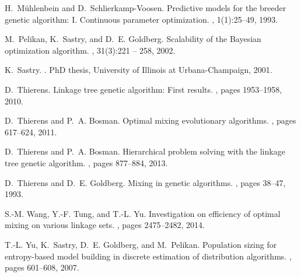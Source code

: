 \documentclass{sig-alternate}
\begin{document}
\begin{thebibliography}{10}
H.~M{\"u}hlenbein and D.~Schlierkamp-Voosen.
\newblock Predictive models for the breeder genetic algorithm: {I}.
  {C}ontinuous parameter optimization.
, 1(1):25--49, 1993.

M.~Pelikan, K.~Sastry, and D.~E. Goldberg.
\newblock Scalability of the {B}ayesian optimization algorithm.
, 31(3):221 --
  258, 2002.

K.~Sastry.
.
\newblock PhD thesis, University of Illinois at Urbana-Champaign, 2001.

D.~Thierens.
\newblock Linkage tree genetic algorithm: First results.
, pages 1953--1958, 2010.

D.~Thierens and P.~A. Bosman.
\newblock Optimal mixing evolutionary algorithms.
, pages 617--624, 2011.

D.~Thierens and P.~A. Bosman.
\newblock Hierarchical problem solving with the linkage tree genetic algorithm.
, pages 877--884, 2013.

D.~Thierens and D.~E. Goldberg.
\newblock Mixing in genetic algorithms.
, pages 38--47, 1993.

S.-M. Wang, Y.-F. Tung, and T.-L. Yu.
\newblock Investigation on efficiency of optimal mixing on various linkage
  sets.
, pages 2475--2482, 2014.

T.-L. Yu, K.~Sastry, D.~E. Goldberg, and M.~Pelikan.
\newblock Population sizing for entropy-based model building in discrete
  estimation of distribution algorithms.
, pages 601--608, 2007.

\end{thebibliography}
\end{document}
